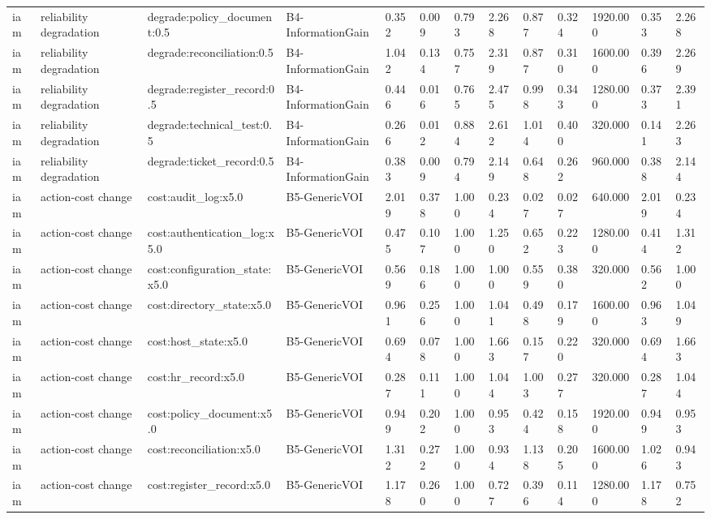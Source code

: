 \begin{table}[!ht]
{\begin{tabular}{lllllllllllll}
iam & reliability degradation & degrade:policy\_document:0.5 & B4-InformationGain & 0.352 & 0.009 & 0.793 & 2.268 & 0.877 & 0.324 & 1920.000 & 0.353 & 2.268 \\
iam & reliability degradation & degrade:reconciliation:0.5 & B4-InformationGain & 1.042 & 0.134 & 0.757 & 2.319 & 0.877 & 0.310 & 1600.000 & 0.396 & 2.269 \\
iam & reliability degradation & degrade:register\_record:0.5 & B4-InformationGain & 0.446 & 0.016 & 0.765 & 2.475 & 0.998 & 0.343 & 1280.000 & 0.373 & 2.391 \\
iam & reliability degradation & degrade:technical\_test:0.5 & B4-InformationGain & 0.266 & 0.012 & 0.884 & 2.612 & 1.014 & 0.400 & 320.000 & 0.141 & 2.263 \\
iam & reliability degradation & degrade:ticket\_record:0.5 & B4-InformationGain & 0.383 & 0.009 & 0.794 & 2.149 & 0.648 & 0.262 & 960.000 & 0.388 & 2.144 \\
iam & action-cost change & cost:audit\_log:x5.0 & B5-GenericVOI & 2.019 & 0.378 & 1.000 & 0.234 & 0.027 & 0.027 & 640.000 & 2.019 & 0.234 \\
iam & action-cost change & cost:authentication\_log:x5.0 & B5-GenericVOI & 0.475 & 0.107 & 1.000 & 1.250 & 0.652 & 0.223 & 1280.000 & 0.414 & 1.312 \\
iam & action-cost change & cost:configuration\_state:x5.0 & B5-GenericVOI & 0.569 & 0.186 & 1.000 & 1.000 & 0.559 & 0.380 & 320.000 & 0.562 & 1.000 \\
iam & action-cost change & cost:directory\_state:x5.0 & B5-GenericVOI & 0.961 & 0.256 & 1.000 & 1.041 & 0.498 & 0.179 & 1600.000 & 0.963 & 1.049 \\
iam & action-cost change & cost:host\_state:x5.0 & B5-GenericVOI & 0.694 & 0.078 & 1.000 & 1.663 & 0.157 & 0.220 & 320.000 & 0.694 & 1.663 \\
iam & action-cost change & cost:hr\_record:x5.0 & B5-GenericVOI & 0.287 & 0.111 & 1.000 & 1.044 & 1.003 & 0.277 & 320.000 & 0.287 & 1.044 \\
iam & action-cost change & cost:policy\_document:x5.0 & B5-GenericVOI & 0.949 & 0.202 & 1.000 & 0.953 & 0.424 & 0.158 & 1920.000 & 0.949 & 0.953 \\
iam & action-cost change & cost:reconciliation:x5.0 & B5-GenericVOI & 1.312 & 0.272 & 1.000 & 0.934 & 1.138 & 0.205 & 1600.000 & 1.026 & 0.943 \\
iam & action-cost change & cost:register\_record:x5.0 & B5-GenericVOI & 1.178 & 0.260 & 1.000 & 0.727 & 0.396 & 0.114 & 1280.000 & 1.178 & 0.752 \\

\end{tabular}}
\end{table}
